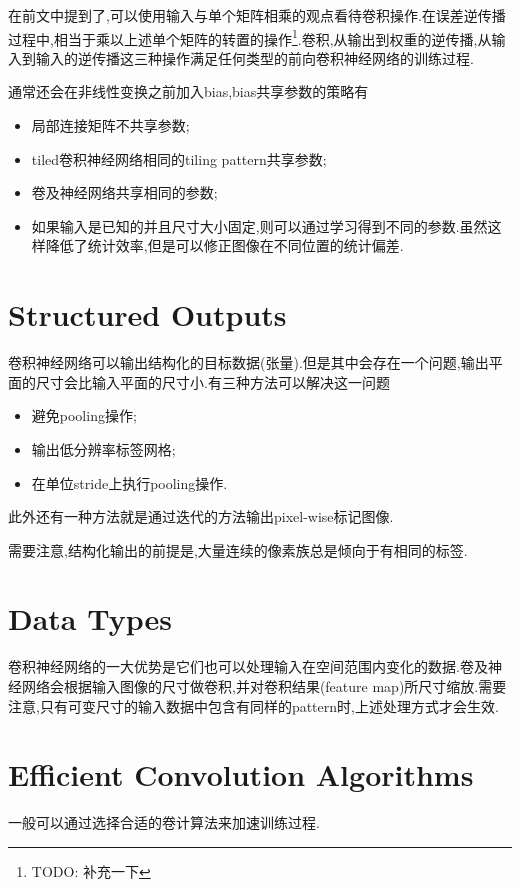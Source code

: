 在前文中提到了,可以使用输入与单个矩阵相乘的观点看待卷积操作.在误差逆传播过程中,相当于乘以上述单个矩阵的转置的操作\footnote{TODO: 补充一下}.卷积,从输出到权重的逆传播,从输入到输入的逆传播这三种操作满足任何类型的前向卷积神经网络的训练过程.

通常还会在非线性变换之前加入bias,bias共享参数的策略有
\begin{itemize}
    \item 局部连接矩阵不共享参数;
    \item tiled卷积神经网络相同的tiling pattern共享参数;
    \item 卷及神经网络共享相同的参数;
    \item 如果输入是已知的并且尺寸大小固定,则可以通过学习得到不同的参数.虽然这样降低了统计效率,但是可以修正图像在不同位置的统计偏差.
\end{itemize}

\section{Structured Outputs}

卷积神经网络可以输出结构化的目标数据(张量).但是其中会存在一个问题,输出平面的尺寸会比输入平面的尺寸小.有三种方法可以解决这一问题
\begin{itemize}
    \item 避免pooling操作;
    \item 输出低分辨率标签网格;
    \item 在单位stride上执行pooling操作.
\end{itemize}
此外还有一种方法就是通过迭代的方法输出pixel-wise标记图像.

需要注意,结构化输出的前提是,大量连续的像素族总是倾向于有相同的标签.

\section{Data Types}

卷积神经网络的一大优势是它们也可以处理输入在空间范围内变化的数据.卷及神经网络会根据输入图像的尺寸做卷积,并对卷积结果(feature map)所尺寸缩放.需要注意,只有可变尺寸的输入数据中包含有同样的pattern时,上述处理方式才会生效.

\section{Efficient Convolution Algorithms}

一般可以通过选择合适的卷计算法来加速训练过程.

